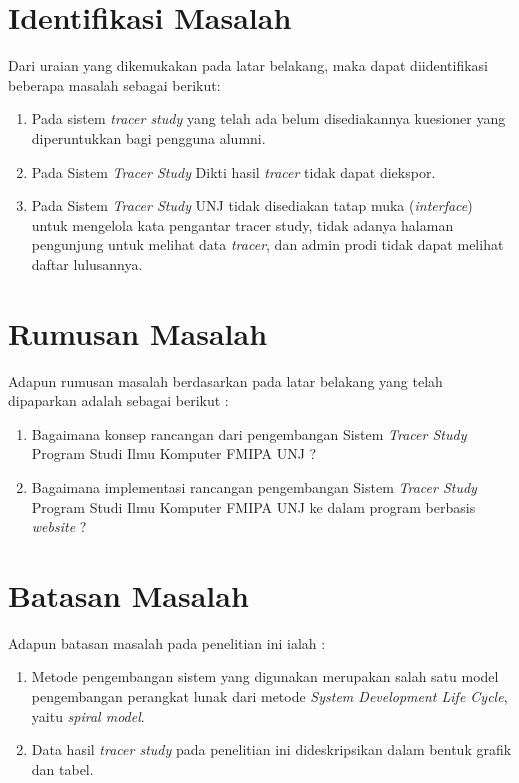 \section{Identifikasi Masalah}
Dari uraian yang dikemukakan pada latar belakang, maka dapat diidentifikasi beberapa masalah sebagai berikut:
\begin{enumerate}
	\item Pada sistem \textit{tracer study} yang telah ada belum disediakannya kuesioner yang diperuntukkan bagi pengguna alumni.
	
	\item Pada Sistem \textit{Tracer Study} Dikti hasil \textit{tracer} tidak dapat diekspor.
	
	\item Pada Sistem \textit{Tracer Study} UNJ tidak disediakan tatap muka (\textit{interface}) untuk mengelola kata pengantar tracer study, tidak adanya halaman pengunjung untuk melihat data \textit{tracer}, dan admin prodi tidak dapat melihat daftar lulusannya. 
	
\end{enumerate}

\section{Rumusan Masalah}
Adapun rumusan masalah berdasarkan pada latar belakang yang telah dipaparkan adalah sebagai berikut :
\begin{enumerate}
	\item Bagaimana konsep rancangan dari pengembangan Sistem \textit{Tracer Study} Program Studi Ilmu Komputer FMIPA UNJ ?
	
	\item Bagaimana implementasi rancangan pengembangan Sistem \textit{Tracer Study} Program Studi Ilmu Komputer FMIPA UNJ ke dalam program berbasis \textit{website} ?
\end{enumerate}

\section{Batasan Masalah}
Adapun batasan masalah pada penelitian ini ialah :
\begin{enumerate}
	\item Metode pengembangan sistem yang digunakan merupakan salah satu model pengembangan perangkat lunak dari metode \textit{System Development Life Cycle}, yaitu \textit{spiral model}.
	
	\item Data hasil \textit{tracer study} pada penelitian ini dideskripsikan dalam bentuk grafik dan tabel.
\end{enumerate}

